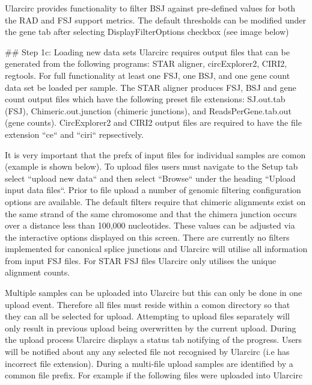 Ularcirc provides functionality to filter BSJ against pre-defined values for both the RAD and FSJ support metrics. The default thresholds can be modified under the gene tab after selecting DisplayFilterOptions checkbox (see image below)



## Step 1c: Loading new data sets
Ularcirc requires output files that can be generated from the following programs: STAR aligner, circExplorer2, CIRI2, regtools. For full functionality at least one FSJ, one BSJ, and one gene count data set be loaded per sample. The STAR aligner produces FSJ, BSJ and gene count output files which have the following preset file extensions: SJ.out.tab (FSJ), Chimeric.out.junction (chimeric junctions), and ReadsPerGene.tab.out (gene counts). CircExplorer2 and CIRI2 output files are required to have the file extension ``ce`` and ``ciri`` repsectively. 

It is very important that the prefx of input files for individual samples are comon (example is shown below). To upload files users must navigate to the Setup tab select ``upload new data`` and then select ``Browse`` under the heading ``Upload input data files``. Prior to file upload a number of genomic filtering configuration options are available. The default filters require that chimeric alignments exist on the same strand of the same chromosome and that the chimera junction occurs over a distance less than 100,000 nucleotides. These values can be adjusted via the interactive options displayed on this screen.  There are currently no filters implemented for canonical splice junctions and Ularcirc will utilise all information from input FSJ files. For STAR FSJ files Ularcirc only utilises the unique alignment counts. 

Multiple samples can be uploaded into Ularcirc but this can only be done in one upload event. Therefore all files must reside within a comon directory so that they can all be selected for upload. Attempting to upload files separately will only result in previous upload being overwritten by the current upload. During the upload process Ularcirc displays a status tab notifying of the progress. Users will be notified about any any selected file not recognised by Ularcirc (i.e has incorrect file extension). During a multi-file upload samples are identified by a common file prefix.  For example if the following files were uploaded into Ularcirc

